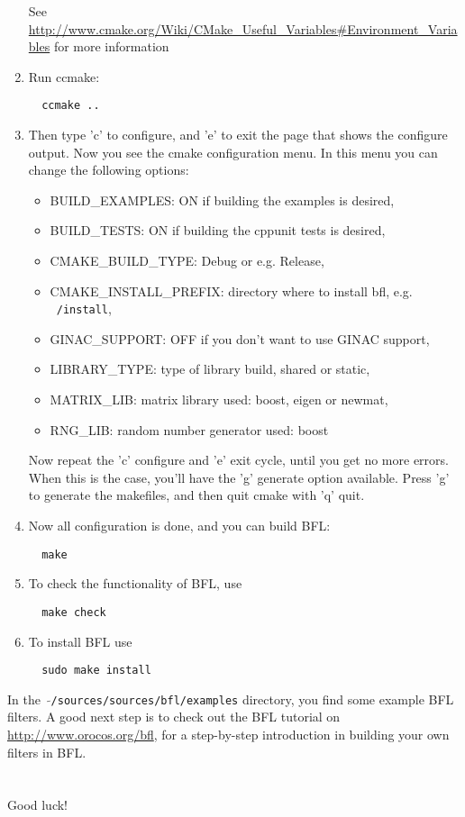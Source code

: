 \documentclass[a4paper,10pt]{article}
\begin{document}
\begin{enumerate}
  See
  \url{http://www.cmake.org/Wiki/CMake_Useful_Variables#Environment_Variables}
  for more information
\item Run ccmake:
\begin{verbatim}
  ccmake ..
\end{verbatim}
\item Then type 'c' to configure, and 'e' to exit the page that shows
  the configure output. Now you see the cmake configuration menu. In
  this menu you can change the following options:
\begin{itemize}
 \item BUILD\_EXAMPLES: ON if building the examples is desired,
 \item BUILD\_TESTS: ON if building the cppunit tests is desired,
 \item CMAKE\_BUILD\_TYPE: Debug or e.g. Release,
 \item CMAKE\_INSTALL\_PREFIX: directory where to install bfl, e.g. \texttt{~/install}, 
 \item GINAC\_SUPPORT: OFF if you don't want to use GINAC support,
 \item LIBRARY\_TYPE: type of library build, shared or static,
 \item MATRIX\_LIB: matrix library used: boost, eigen or newmat,
 \item RNG\_LIB: random number generator used: boost
\end{itemize}
Now repeat the 'c' configure and 'e' exit cycle, until you get no more
errors. When this is the case, you'll have the 'g' generate option
available. Press 'g' to generate the makefiles, and then quit cmake
with 'q' quit.
\item Now all configuration is done, and you can build BFL:
\begin{verbatim}
  make 
\end{verbatim}	
\item To check the functionality of BFL, use
\begin{verbatim}
  make check
\end{verbatim}	
\item To install BFL use
\begin{verbatim}
  sudo make install
\end{verbatim}
\end{enumerate}
In the \ $\mathtt{\tilde{ }}$\texttt{/sources/sources/bfl/examples} directory, you find some example BFL
filters. A good next step is to check out the BFL tutorial on
\url{http://www.orocos.org/bfl}, for a step-by-step introduction in building
your own filters in BFL.
\\\\\\
Good luck!
\end{document}
